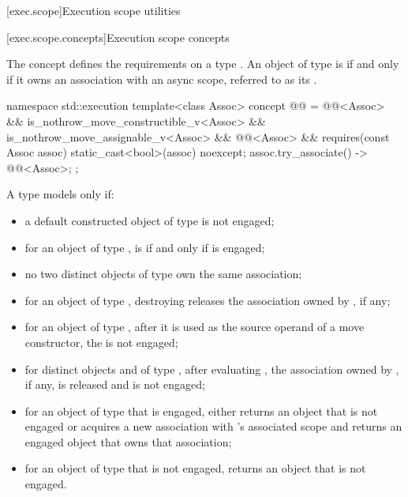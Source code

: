 [exec.scope]{Execution scope utilities}

[exec.scope.concepts]{Execution scope concepts}

\pnum
The  concept defines
the requirements on a type .
An object of type  is 
if and only if it owns an association with an async scope,
referred to as its .

\begin{codeblock}
namespace std::execution {
  template<class Assoc>
    concept @@ =
      @@<Assoc> &&
      is_nothrow_move_constructible_v<Assoc> &&
      is_nothrow_move_assignable_v<Assoc> &&
      @@<Assoc> &&
      requires(const Assoc assoc) {
        { static_cast<bool>(assoc) } noexcept;
        { assoc.try_associate() } -> @@<Assoc>;
      };
}
\end{codeblock}

\pnum
A type  models  only if:
\begin{itemize}
\item
a default constructed object of type  is not engaged;
\item
for an object  of type ,
 is 
if and only if  is engaged;
\item
no two distinct objects of type  own the same association;
\item
for an object  of type ,
destroying  releases the association owned by , if any;
\item
for an object  of type ,
after it is used as the source operand of a move constructor,
the  is not engaged;
\item
for distinct objects  and  of type ,
after evaluating ,
the association owned by , if any, is released and
 is not engaged;
\item
for an object  of type  that is engaged,
 either
returns an object that is not engaged or
acquires a new association with 's associated scope and
returns an engaged object that owns that association;
\item
for an object  of type  that is not engaged,
 returns an object that is not engaged.
\end{itemize}

